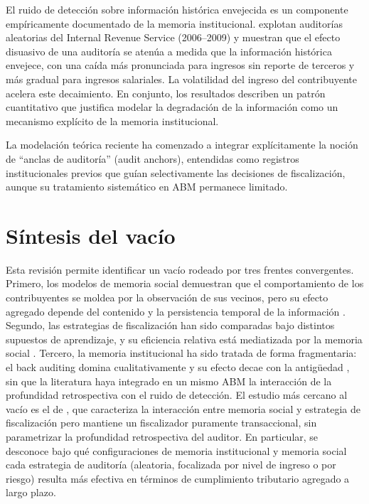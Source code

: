 El ruido de detección sobre información histórica envejecida es un componente empíricamente documentado de la memoria institucional. \textcite{debacker2018once} explotan auditorías aleatorias del Internal Revenue Service (2006--2009) y muestran que el efecto disuasivo de una auditoría se atenúa a medida que la información histórica envejece, con una caída más pronunciada para ingresos sin reporte de terceros y más gradual para ingresos salariales. La volatilidad del ingreso del contribuyente acelera este decaimiento. En conjunto, los resultados describen un patrón cuantitativo que justifica modelar la degradación de la información como un mecanismo explícito de la memoria institucional.

La modelación teórica reciente ha comenzado a integrar explícitamente la noción de ``anclas de auditoría'' (audit anchors), entendidas como registros institucionales previos que guían selectivamente las decisiones de fiscalización, aunque su tratamiento sistemático en ABM permanece limitado.

\section{Síntesis del vacío}
\label{sec:edo-vacio}

Esta revisión permite identificar un vacío rodeado por tres frentes convergentes. Primero, los modelos de memoria social demuestran que el comportamiento de los contribuyentes se moldea por la observación de sus vecinos, pero su efecto agregado depende del contenido y la persistencia temporal de la información \parencite{andrei2014agent, dimauro2019contagion, alm2017neighbour, garcia2019network}. Segundo, las estrategias de fiscalización han sido comparadas bajo distintos supuestos de aprendizaje, y su eficiencia relativa está mediatizada por la memoria social \parencite{hashimzade2014agent, hashimzade2016predictive, canessa2025tax}. Tercero, la memoria institucional ha sido tratada de forma fragmentaria: el back auditing domina cualitativamente \parencite{hokamp2014dynamics} y su efecto decae con la antigüedad \parencite{debacker2018once}, sin que la literatura haya integrado en un mismo ABM la interacción de la profundidad retrospectiva con el ruido de detección. El estudio más cercano al vacío es el de \textcite{canessa2025tax}, que caracteriza la interacción entre memoria social y estrategia de fiscalización pero mantiene un fiscalizador puramente transaccional, sin parametrizar la profundidad retrospectiva del auditor. En particular, se desconoce bajo qué configuraciones de memoria institucional y memoria social cada estrategia de auditoría (aleatoria, focalizada por nivel de ingreso o por riesgo) resulta más efectiva en términos de cumplimiento tributario agregado a largo plazo.
